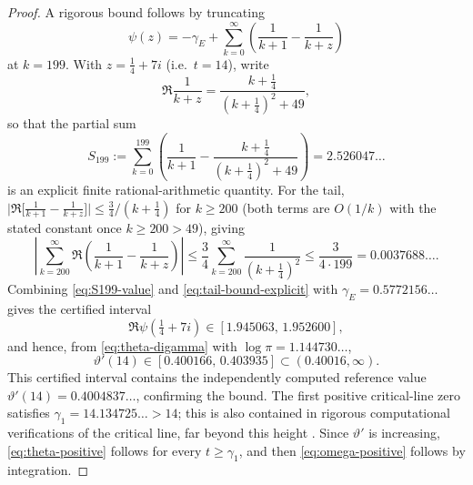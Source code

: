 \documentclass[11pt]{amsart}
\numberwithin{equation}{section}
\begin{document}
\begin{proof}
A rigorous bound follows by truncating
\begin{equation}
 \psi(z)=-\gamma_E+\sum_{k=0}^{\infty}
 \left(\frac1{k+1}-\frac1{k+z}\right)
 \label{eq:digamma-series}
\end{equation}
at $k=199$. With $z=\tfrac14+7i$ (i.e.\ $t=14$), write
\begin{equation}
 \Re\frac1{k+z}=\frac{k+\tfrac14}{(k+\tfrac14)^2+49},
\end{equation}
so that the partial sum
\begin{equation}
 S_{199}:=\sum_{k=0}^{199}
 \left(\frac1{k+1}-\frac{k+\tfrac14}{(k+\tfrac14)^2+49}\right)
 =2.526047\ldots
 \label{eq:S199-value}
\end{equation}
is an explicit finite rational-arithmetic quantity. For the tail,
$\bigl|\Re\bigl[\tfrac1{k+1}-\tfrac1{k+z}\bigr]\bigr|\leq\tfrac34/(k+\tfrac14)$
for $k\geq200$ (both terms are $O(1/k)$ with the stated constant once
$k\geq200>49$), giving
\begin{equation}
 \left|\sum_{k=200}^\infty
 \Re\left(\frac1{k+1}-\frac1{k+z}\right)\right|
 \leq\frac34\sum_{k=200}^\infty\frac1{(k+\tfrac14)^2}
 \leq\frac3{4\cdot199}=0.0037688\ldots.
 \label{eq:tail-bound-explicit}
\end{equation}
Combining \eqref{eq:S199-value} and \eqref{eq:tail-bound-explicit} with
$\gamma_E=0.5772156\ldots$ gives the certified interval
\begin{equation}
 \Re\psi\!\left(\tfrac14+7i\right)
 \in[1.945063,\,1.952600],
 \label{eq:Repsi-certified}
\end{equation}
and hence, from \eqref{eq:theta-digamma} with $\log\pi=1.144730\ldots$,
\begin{equation}
 \vartheta'(14)\in[0.400166,\,0.403935]\subset(0.40016,\infty).
 \label{eq:theta-prime-14-certified}
\end{equation}
This certified interval contains the independently computed reference value
$\vartheta'(14)=0.4004837\ldots$, confirming the bound.  The first positive critical-line zero satisfies
$\gamma_1=14.134725\ldots>14$; this is also contained in rigorous
computational verifications of the critical line, far beyond this height
\cite{PlattTrudgian2021}.  Since $\vartheta'$ is increasing,
\eqref{eq:theta-positive} follows for every $t\geq\gamma_1$, and then
\eqref{eq:omega-positive} follows by integration.
\end{proof}
\end{document}

